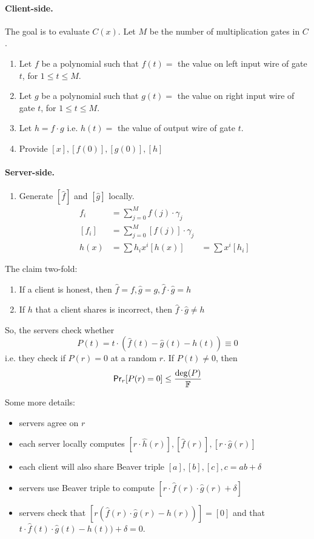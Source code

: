 \paragraph{Client-side.}
The goal is to evaluate $C(x)$.
Let $M$ be the number of multiplication gates in $C$.
\begin{enumerate}
\item 
Let $f$ be a polynomial such that $f(t) = $ the value on left input wire of gate $t$, for $1 \leq t \leq M$.
\item 
Let $g$ be a polynomial such that $g(t) = $ the value on right input wire of gate $t$, for $1 \leq t \leq M$.
\item 
Let $h = f \cdot g$ i.e. $h(t) =$ the value of output wire of gate $t$.
\item 
Provide $[x], [f(0)], [g(0)], [h]$
\end{enumerate}

\paragraph{Server-side.}
\begin{enumerate}
\item 
Generate $[\hat{f}]$ and $[\hat{g}]$ locally.
\begin{align*}
    f_i &= \sum_{j=0}^M f(j) \cdot \gamma_j \\
    [f_i] &= \sum_{j=0}^M [f(j)] \cdot \gamma_j \\
    h(x) &= \sum h_i x^i
    [h(x)] &= \sum x^i [h_i]
\end{align*}
\end{enumerate}

The claim two-fold:
\begin{enumerate}
\item If a client is honest, then $\hat{f} = f, \hat{g} = g, \hat{f} \cdot \hat{g} = h$
\item If $h$ that a client shares is incorrect, then $\hat{f} \cdot \hat{g} \neq h$
\end{enumerate}
So, the servers check whether 
\[
    P(t) = t \cdot (\hat{f}(t) - \hat{g}(t) - h(t)) \equiv 0
\]
i.e. they check if $P(r) = 0$ at a random $r$.
If $P(t) \neq 0$, then
\[
    \mathsf{Pr}_r[P(r) = 0] \leq \frac{\deg(P)}{\mathbb{F}}
\]

Some more details:
\begin{itemize}
\item servers agree on $r$
\item each server locally computes $[r \cdot \hat{h}(r)], [\hat{f}(r)], [r \cdot \hat{g}(r)]$
\item each client will also share Beaver triple $[a], [b], [c], c = ab + \delta$
\item servers use Beaver triple to compute $[r \cdot \hat{f}(r) \cdot \hat{g}(r) + \delta]$
\item servers check that $[r(\hat{f}(r) \cdot \hat{g}(r) - h(r))] = [0]$ and that $t \cdot \hat{f}(t) \cdot \hat{g}(t) - h(t)) + \delta = 0$.
\end{itemize}